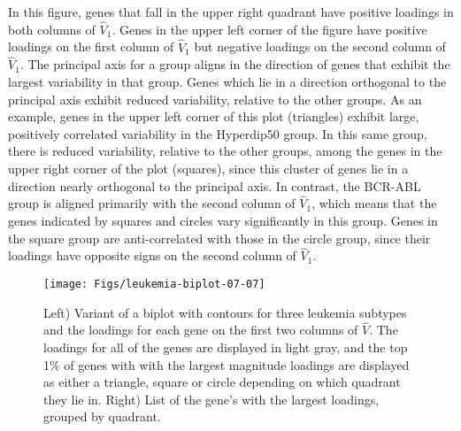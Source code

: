 \documentclass[12pt]{article}
\begin{document}
In this figure, genes that fall in the upper right quadrant have
positive loadings in both columns of $\hat{V}_1$. Genes in the upper left
corner of the figure have positive loadings on the first column of $\hat{V}_1$
but negative loadings on the second column of $\hat{V}_1$.  The principal axis
for a group aligns in the direction of genes that exhibit the largest
variability in that group.  Genes which lie in a direction orthogonal
to the principal axis exhibit reduced variability, relative to the
other groups. As an example, genes in the upper left corner of this
plot (triangles) exhibit large, positively correlated variability in
the Hyperdip50 group.  In this same group, there is reduced
variability, relative to the other groups, among the genes in the
upper right corner of the plot (squares), since this cluster of genes lie in
a direction nearly orthogonal to the principal axis.  In contrast, the
BCR-ABL group is aligned primarily with the second column of $\hat{V}_1$,
which means that the genes indicated by squares and circles vary
significantly in this group.  Genes in the square group are
anti-correlated with those in the circle group, since their
loadings have opposite signs on the second column of $\hat{V}_1$.


  \begin{figure}[!ht]
    \centering
    \texttt{[image: Figs/leukemia-biplot-07-07]}
    \qquad
\raisebox{1\height}{
\scriptsize

}
\caption{Left) Variant of a biplot with contours for three leukemia
  subtypes and the loadings for each gene on the first two columns of
  $\hat{V}$.  The loadings for all of the genes are displayed in light gray, and the
  top 1\% of genes with with the largest magnitude loadings are
  displayed as either a triangle, square or circle depending on which
  quadrant they lie in.  Right) List of the gene's with the largest
  loadings, grouped by quadrant.}
\label{fig:leukemiaBiplot}
\end{figure}
\end{document}
